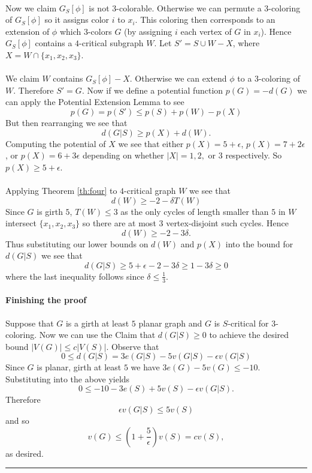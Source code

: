 \documentclass[letterpaper,12pt,oneside,onecolumn]{article}
\newenvironment{proof}{{\bf Proof:  }}{\hfill\rule{2mm}{2mm}}
\begin{document}
\begin{proof}
	\paragraph{}
	Now we claim $G_S[\phi]$ is not $3$-colorable. Otherwise we can permute a $3$-coloring of $G_S[\phi]$ so it assigns color $i$ to $x_i$. This coloring then corresponds to an extension of $\phi$ which $3$-colors $G$ (by assigning $i$ each vertex of $G$ in $x_i$). Hence $G_S[\phi]$ contains a $4$-critical subgraph $W$. Let $S' = S \cup W - X$, where $X = W \cap \{x_1,x_2,x_3\}$.
	\paragraph{}
	We claim $W$ contains $G_S[\phi] - X$. Otherwise we can extend $\phi$ to a $3$-coloring of $W$. Therefore $S' = G$. Now if we define a potential function $p(G) = -d(G)$ we can apply the Potential Extension Lemma to see
	$$p(G) = p(S') \leq p(S) + p(W) - p(X)$$
	But then rearranging we see that
	$$d(G|S) \geq p(X) + d(W).$$
	Computing the potential of $X$ we see that either $p(X) = 5+\epsilon$, $p(X) = 7 + 2\epsilon$, or $p(X) = 6+3\epsilon$ depending on whether $|X| = 1, 2,$ or $3$ respectively. So $p(X) \geq 5+\epsilon$.
	\paragraph{}
	Applying Theorem \ref{th:four} to $4$-critical graph $W$ we see that
	$$d(W) \geq -2 - \delta T(W)$$
	Since $G$ is girth $5$, $T(W) \leq 3$ as the only cycles of length smaller than $5$ in $W$ intersect $\{x_1,x_2,x_3\}$ so there are at most $3$ vertex-disjoint such cycles. Hence
	$$d(W) \geq -2 - 3\delta.$$
	Thus substituting our lower bounds on $d(W)$ and $p(X)$ into the bound for $d(G|S)$ we see that
	$$d(G|S) \geq 5+\epsilon -2-3\delta \geq 1 - 3\delta \geq 0$$
	where the last inequality follows since $\delta \leq \frac{1}{3}$.
	\paragraph{Finishing the proof}
	Suppose that $G$ is a girth at least $5$ planar graph and $G$ is $S$-critical for $3$-coloring. Now we can use the Claim that $d(G|S) \geq 0$ to achieve the desired bound $|V(G)| \leq c|V(S)|$. Observe that
	$$0 \leq d(G|S) = 3e(G|S) -5v(G|S) -\epsilon v(G|S)$$
	Since $G$ is planar, girth at least $5$ we have $3e(G) -5v(G) \leq -10$. Substituting into the above yields
	$$0 \leq -10 -3e(S) +5v(S) - \epsilon v(G|S).$$ Therefore
	$$\epsilon v(G|S) \leq 5v(S)$$
	and so 
	$$v(G) \leq (1+\frac{5}{\epsilon}) v(S) = c v(S),$$
	as desired.
	\end{proof}
\end{document}
